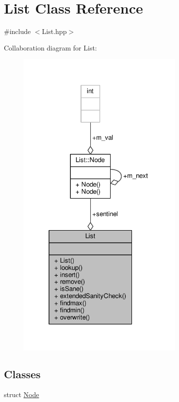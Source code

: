 \hypertarget{classList}{\section{List Class Reference}
\label{classList}
}


{\ttfamily \#include $<$List.\-hpp$>$}



Collaboration diagram for List\-:
\nopagebreak
\begin{figure}[H]
\begin{center}
\leavevmode
\includegraphics[width=235pt]{classList__coll__graph}
\end{center}
\end{figure}
\subsection*{Classes}
\begin{DoxyCompactItemize}
\item 
struct \hyperlink{structList_1_1Node}{Node}
\end{DoxyCompactItemize}

